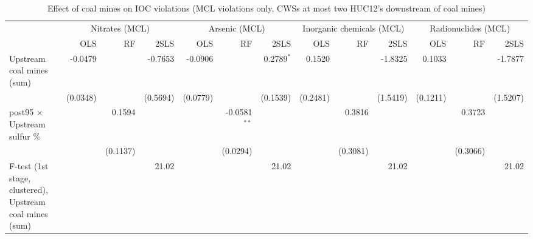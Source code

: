 
\begin{table}[htbp]
   
   \caption{\label{2sls_dwnstrm2step_minevio_mcl_ivsum} Effect of coal mines on IOC violations (MCL violations only, CWSs at most two HUC12's downstream of coal mines)}
   \bigskip
   
   \centering
   
   \begin{adjustbox}{width = \textwidth, center}
      
      
      \begin{tabular}{lrrrrrrrrrrrr}
         \toprule
         
          & \multicolumn{3}{c}{Nitrates (MCL)} & \multicolumn{3}{c}{Arsenic (MCL)} & \multicolumn{3}{c}{Inorganic chemicals (MCL)} & \multicolumn{3}{c}{Radionuclides (MCL)}\\
         
                                                                  & OLS      & RF       & 2SLS     & OLS      & RF             & 2SLS         & OLS      & RF       & 2SLS     & OLS      & RF       & 2SLS\\  
         
         \midrule 
         Upstream coal mines (sum)                                & -0.0479  &          & -0.7653  & -0.0906  &                & 0.2789$^{*}$ & 0.1520   &          & -1.8325  & 0.1033   &          & -1.7877\\   
                                                                  & (0.0348) &          & (0.5694) & (0.0779) &                & (0.1539)     & (0.2481) &          & (1.5419) & (0.1211) &          & (1.5207)\\   
         post95 $\times$ Upstream sulfur \%                       &          & 0.1594   &          &          & -0.0581$^{**}$ &              &          & 0.3816   &          &          & 0.3723   &   \\   
                                                                  &          & (0.1137) &          &          & (0.0294)       &              &          & (0.3081) &          &          & (0.3066) &   \\   
         
         F-test (1st stage, clustered), Upstream coal mines (sum) &          &          & 21.02    &          &                & 21.02        &          &          & 21.02    &          &          & 21.02\\  
         

\end{tabular}
\end{adjustbox}
\end{table}
